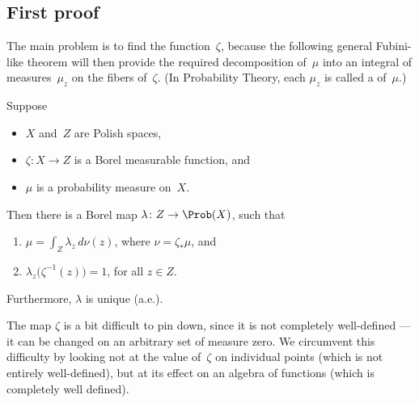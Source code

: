 \subsection{First proof}
The main problem is to find the function~$\zeta$, because the following general Fubini-like theorem will then provide the required decomposition of~$\mu$ into an integral of measures~$\mu_z$ on the fibers of~$\zeta$. (In Probability Theory, each $\mu_z$ is called a  of~$\mu$.)

\begin{prop} %
\label{RokhlinDecompMeas}
Suppose
	\begin{itemize}
	\item $X$ and~$Z$ are Polish spaces,
	\item $\zeta \colon X \to Z$ is a Borel measurable function,
	and
	\item $\mu$ is a probability measure on~$X$.
	\end{itemize}
Then there is a Borel map $\lambda \colon Z \to \Prob(X)$, such that 
 \begin{enumerate}
 \item $\mu = \int_Z \lambda_z \, d\nu(z)$, where $\nu = \zeta_*\mu$,
 and
 \item $\lambda_z \bigl( \zeta^{-1}(z) \bigr) = 1$, for all $z \in Z$.
 \end{enumerate}
 Furthermore, $\lambda$ is unique\/ \textup(a.e.\textup).
 \end{prop}

The map $\zeta$ is a bit difficult to pin down, since it is not completely well-defined --- it can be changed on an arbitrary set of measure zero. We circumvent this difficulty by looking not at the value of~$\zeta$ on individual points (which is not entirely well-defined), but at its effect on an algebra of functions (which is completely well defined). 

